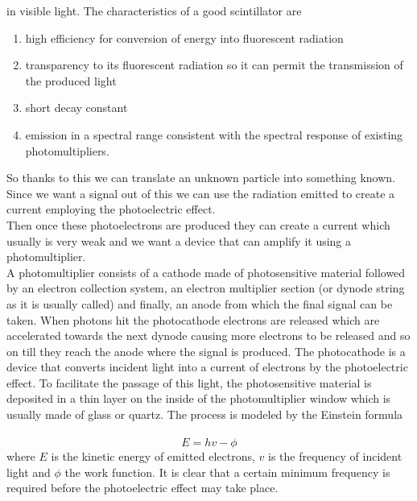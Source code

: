 in visible light. The characteristics of a good scintillator are
\begin{enumerate}
   \item high efficiency for conversion of energy into fluorescent radiation
    \item transparency to its fluorescent radiation so it can permit the transmission of the produced light
    \item short decay constant
    \item emission in a spectral range consistent with the spectral response of existing photomultipliers. 
\end{enumerate}
So thanks to this we can translate an unknown particle into something known. 
Since we want a signal out of this we can use the radiation emitted to create a current 
employing the photoelectric effect.\\ 
Then once these photoelectrons are produced they can create a current which usually is very
weak and we want a device that can amplify it using a photomultiplier.\\
A photomultiplier consists of a cathode made of photosensitive material followed by an
electron collection system, an electron multiplier section (or dynode string as it is usually called)
and finally, an anode from which the final signal can be taken.
When photons hit the photocathode electrons are released which are accelerated towards
the next dynode causing more electrons to be released and so on till they reach the anode
where the signal is produced. The photocathode is a device that converts incident light
into a current of electrons by the photoelectric effect. To facilitate the passage of this light,
the photosensitive material is deposited in a thin layer on the inside of the photomultiplier
window which is usually made of glass or quartz.
The process is modeled by the Einstein formula\\\\
\begin{equation*}
E=hv - \phi 
\end{equation*}
where $E$ is the kinetic energy of emitted electrons, $v$ is the frequency of incident light
and $\phi$ the work function. It is clear that a certain minimum frequency
is required before the photoelectric effect may take place.

